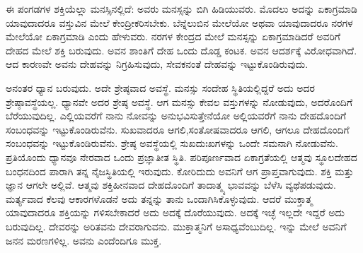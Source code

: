 ಈ ಪಂಗಡಗಳ ಶಕ್ತಿಯೆಲ್ಲಾ ಮನಸ್ಸಿನಲ್ಲಿದೆ: ಅವರು ಮನಸ್ಸನ್ನು ಬಿಗಿ ಹಿಡಿಯುವರು. ಮೊದಲು ಅದನ್ನು ಏಕಾಗ್ರಮಾಡಿ ಯಾವುದಾದರೂ ವಸ್ತುವಿನ ಮೇಲೆ ಕೇಂದ್ರೀಕರಿಸಬೇಕು. ಬೆನ್ನೆಲುಬಿನ ಮೇಲೆಯೋ ಅಥವಾ ಯಾವುದಾದರೂ ನರಗಳ ಮೇಲೆಯೋ ಏಕಾಗ್ರಮಾಡಿ ಎಂದು ಹೇಳುವರು. ನರಗಳ ಕೇಂದ್ರದ ಮೇಲೆ ಮನಸ್ಸನ್ನು ಏಕಾಗ್ರಮಾಡಿದರೆ ಅವರಿಗೆ ದೇಹದ ಮೇಲೆ ಶಕ್ತಿ ಬರುವುದು. ಅವನ ಶಾಂತಿಗೆ ದೇಹ ಒಂದು ದೊಡ್ಡ ಕಂಟಕ. ಅವನ ಆದರ್ಶಕ್ಕೆ ವಿರೋಧವಾಗಿದೆ. ಆದ ಕಾರಣವೇ ಅವನು ದೇಹವನ್ನು ನಿಗ್ರಹಿಸುವುದು, ಸೇವಕನಂತೆ ದೇಹವನ್ನು ಇಟ್ಟುಕೊಂಡಿರುವುದು.

ಅನಂತರ ಧ್ಯಾನ ಬರುವುದು. ಅದೇ ಶ್ರೇಷ್ಠವಾದ ಅವಸ್ಥೆ. ಮನಸ್ಸು ಸಂದೇಹ ಸ್ಥಿತಿಯಲ್ಲಿದ್ದರೆ ಅದು ಅದರ ಶ್ರೇಷ್ಠಾವಸ್ಥೆಯಲ್ಲ. ಧ್ಯಾನವೇ ಅದರ ಶ್ರೇಷ್ಠ ಅವಸ್ಥೆ. ಆಗ ಮನಸ್ಸು ಕೇವಲ ವಸ್ತುಗಳನ್ನು ನೋಡುವುದು, ಅದರೊಂದಿಗೆ ಬೆರೆಯುವುದಿಲ್ಲ. ಎಲ್ಲಿಯವರೆಗೆ ನಾನು ನೋವನ್ನು ಅನುಭವಿಸುತ್ತೇನೆಯೋ ಅಲ್ಲಿಯವರೆಗೆ ನಾನು ದೇಹದೊಂದಿಗೆ ಸಂಬಂಧವನ್ನು ಇಟ್ಟುಕೊಂಡಿರುವೆನು. ಸುಖವಾದರೂ ಆಗಲಿ,\break ಸಂತೋಷವಾದರೂ ಆಗಲಿ, ಆಗಲೂ ದೇಹದೊಂದಿಗೆ ಸಂಬಂಧವನ್ನು ಇಟ್ಟುಕೊಂಡಿರುವೆನು. ಶ್ರೇಷ್ಠ ಅವಸ್ಥೆಯಲ್ಲಿ ಸುಖದುಃಖಗಳನ್ನು ಒಂದೇ ಸಮನಾಗಿ ನೋಡುವೆನು. ಪ್ರತಿಯೊಂದು ಧ್ಯಾನವೂ ನೇರವಾದ ಒಂದು ಪ್ರಜ್ಞಾತೀತ ಸ್ಥಿತಿ. ಪರಿಪೂರ್ಣವಾದ ಏಕಾಗ್ರತೆಯಲ್ಲಿ ಆತ್ಮವು ಸ್ಥೂಲದೇಹದ ಬಂಧನದಿಂದ ಪಾರಾಗಿ ತನ್ನ ನೈಜಸ್ಥಿತಿಯಲ್ಲಿ ಇರುವುದು. ಕೋರಿದುದು ಅವನಿಗೆ ಆಗ ಪ್ರಾಪ್ತವಾಗುವುದು. ಶಕ್ತಿ ಮತ್ತು ಜ್ಞಾನ ಆಗಲೇ ಅಲ್ಲಿವೆ. ಆತ್ಮವು ಶಕ್ತಿಹೀನವಾದ ದೇಹದೊಂದಿಗೆ ತಾದಾತ್ಮ್ಯ ಭಾವವನ್ನು ಬೆಳೆಸಿ ವ್ಯಥೆಪಡುವುದು. ಮರ್ತ್ಯವಾದ ಕೆಲವು ಆಕಾರಗಳೊಡನೆ ಅದು ತನ್ನನ್ನು ತಾನು ಒಂದಾಗಿಸಿಕೊಳ್ಳುವುದು. ಆದರೆ ಮುಕ್ತಾತ್ಮ ಯಾವುದಾದರೂ ಶಕ್ತಿಯನ್ನು ಗಳಿಸಬೇಕಾದರೆ ಅದು ಅದಕ್ಕೆ ದೊರೆಯುವುದು. ಅದಕ್ಕೆ ಇಚ್ಛೆ ಇಲ್ಲದೇ ಇದ್ದರೆ ಅದು ಬರುವುದಿಲ್ಲ. ದೇವರನ್ನು ಅರಿತವನು ದೇವರಾಗುವನು. ಮುಕ್ತಾತ್ಮನಿಗೆ ಅಸಾಧ್ಯವೆಂಬುದಿಲ್ಲ. ಇನ್ನು ಮೇಲೆ ಅವನಿಗೆ ಜನನ ಮರಣಗಳಿಲ್ಲ. ಅವನು ಎಂದೆಂದಿಗೂ ಮುಕ್ತ.

